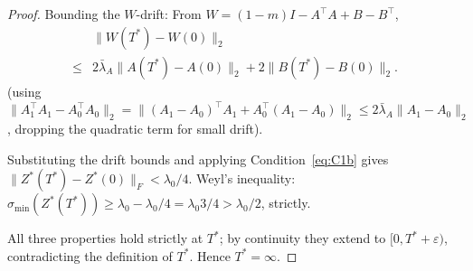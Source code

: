 \documentclass[twoside]{article}
\newcommand{\sigmamin}{\sigma_{\min}}
\begin{document}
\begin{proof}
Bounding the $W$-drift: From $W = (1-m)I - A^\top A + B - B^\top$,
\begin{align*}
    &\|W(T^*)-W(0)\|_2 \\ \leq& 2\bar\lambda_A\|A(T^*)-A(0)\|_2 + 2\|B(T^*)-B(0)\|_2.
\end{align*}
(using $\|A_1^\top A_1 - A_0^\top A_0\|_2 = \|(A_1-A_0)^\top A_1 + A_0^\top(A_1-A_0)\|_2 \leq 2\bar\lambda_A\|A_1-A_0\|_2$, dropping the quadratic term for small drift).

Substituting the drift bounds and applying Condition~\eqref{eq:C1b} gives
$\|Z^*(T^*)-Z^*(0)\|_F < \lambda_0/4$.
Weyl's inequality: $\sigmamin(Z^*(T^*)) \geq \lambda_0 - \lambda_0/4 = \lambda_0 3/4 > \lambda_0 / 2$, strictly.

All three properties hold strictly at $T^*$; by continuity they extend to
$[0,T^*+\varepsilon)$, contradicting the definition of $T^*$.  Hence $T^* = \infty$.
\end{proof}




\end{document}
